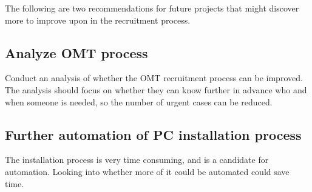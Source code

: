 The following are two recommendations for future projects that might discover more to improve upon in the recruitment process.

\subsection{Analyze OMT process}
Conduct an analysis of whether the OMT recruitment process can be improved.
The analysis should focus on whether they can know further in advance who and when someone is needed, so the number of urgent cases can be reduced.

\subsection{Further automation of PC installation process}
The installation process is very time consuming, and is a candidate for automation.
Looking into whether more of it could be automated could save time.
